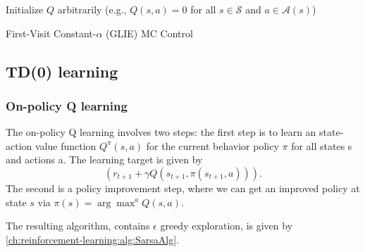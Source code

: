 \begin{refsection}
\begin{algorithm}
	Initialize $Q$ arbitrarily (e.g., $Q(s,a) = 0$ for all $s\in\mathcal{S}$ and $a\in\mathcal{A}(s)$) \\
	\KwRet{$\pi$}
	\caption{First-Visit Constant-$\alpha$ (GLIE) MC Control}
\end{algorithm}


\subsection{TD(0) learning}

\subsubsection{On-policy Q learning}

The on-policy Q learning involves two steps:
the first step is to learn an state-action value function $Q^\pi(s, a)$ for the current behavior
policy $\pi$ for all states s and actions a. The learning target is given by
$$(r_{t+1} + \gamma Q(s_{t+1}, \pi(s_{t+1},a))).$$
The second is a policy improvement step, where we can get an improved policy at state $s$ via
$\pi(s) = \arg\max^{a} Q(s,a)$.

The resulting algorithm, contains $\epsilon$ greedy exploration, is given by \autoref{ch:reinforcement-learning:alg:SarsaAlg}.


\end{refsection}
